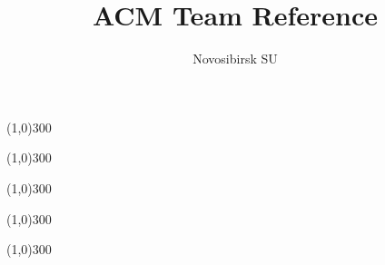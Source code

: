 \documentclass{article}
\title{ACM Team Reference}
\author{Novosibirsk SU}
\begin{document}


\line(1,0){300}


\line(1,0){300}







\line(1,0){300}





\line(1,0){300}




\line(1,0){300}


\end{document}
